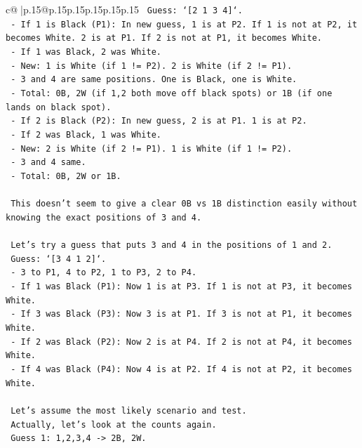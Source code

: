 \documentclass{article}
\begin{document}
{\begin{supertabular}{c@{$\;$}|p{.15\linewidth}@{}p{.15\linewidth}p{.15\linewidth}p{.15\linewidth}p{.15\linewidth}p{.15\linewidth}}
{{{\texttt{    Guess: `{[}2 1 3 4{]}`.} \\
\texttt{    {-} If 1 is Black (P1): In new guess, 1 is at P2. If 1 is not at P2, it becomes White. 2 is at P1. If 2 is not at P1, it becomes White.} \\
\texttt{      {-} If 1 was Black, 2 was White.} \\
\texttt{      {-} New: 1 is White (if 1 != P2). 2 is White (if 2 != P1).} \\
\texttt{      {-} 3 and 4 are same positions. One is Black, one is White.} \\
\texttt{      {-} Total: 0B, 2W (if 1,2 both move off black spots) or 1B (if one lands on black spot).} \\
\texttt{    {-} If 2 is Black (P2): In new guess, 2 is at P1. 1 is at P2.} \\
\texttt{      {-} If 2 was Black, 1 was White.} \\
\texttt{      {-} New: 2 is White (if 2 != P1). 1 is White (if 1 != P2).} \\
\texttt{      {-} 3 and 4 same.} \\
\texttt{      {-} Total: 0B, 2W or 1B.} \\
\\ 
\texttt{    This doesn't seem to give a clear 0B vs 1B distinction easily without knowing the exact positions of 3 and 4.} \\
\\ 
\texttt{    Let's try a guess that puts 3 and 4 in the positions of 1 and 2.} \\
\texttt{    Guess: `{[}3 4 1 2{]}`.} \\
\texttt{    {-} 3 to P1, 4 to P2, 1 to P3, 2 to P4.} \\
\texttt{    {-} If 1 was Black (P1): Now 1 is at P3. If 1 is not at P3, it becomes White.} \\
\texttt{    {-} If 3 was Black (P3): Now 3 is at P1. If 3 is not at P1, it becomes White.} \\
\texttt{    {-} If 2 was Black (P2): Now 2 is at P4. If 2 is not at P4, it becomes White.} \\
\texttt{    {-} If 4 was Black (P4): Now 4 is at P2. If 4 is not at P2, it becomes White.} \\
\\ 
\texttt{    Let's assume the most likely scenario and test.} \\
\texttt{    Actually, let's look at the counts again.} \\
\texttt{    Guess 1: 1,2,3,4 {-}> 2B, 2W.} \\
}}}
\end{supertabular}}
\end{document}
